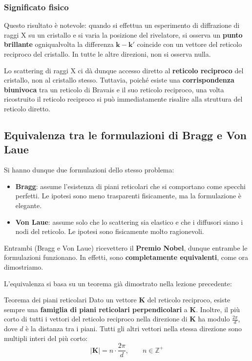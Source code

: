 \subsubsection{Significato fisico}

Questo risultato è notevole: quando si effettua un esperimento di diffrazione di raggi X su un cristallo e si varia la posizione del rivelatore, si osserva un \textbf{punto brillante} ogniqualvolta la differenza $\mathbf{k} - \mathbf{k}'$ coincide con un vettore del reticolo reciproco del cristallo. In tutte le altre direzioni, non si osserva nulla.

Lo scattering di raggi X ci dà dunque accesso diretto al \textbf{reticolo reciproco} del cristallo, non al cristallo stesso. Tuttavia, poiché esiste una \textbf{corrispondenza biunivoca} tra un reticolo di Bravais e il suo reticolo reciproco, una volta ricostruito il reticolo reciproco si può immediatamente risalire alla struttura del reticolo diretto.

\subsection{Equivalenza tra le formulazioni di Bragg e Von Laue}


Si hanno dunque due formulazioni dello stesso problema:

\begin{itemize}
    \item \textbf{Bragg}: assume l'esistenza di piani reticolari che si comportano come specchi perfetti. Le ipotesi sono meno trasparenti fisicamente, ma la formulazione è elegante.
    \item \textbf{Von Laue}: assume solo che lo scattering sia elastico e che i diffusori siano i nodi del reticolo. Le ipotesi sono fisicamente molto ragionevoli.
\end{itemize}

Entrambi (Bragg e Von Laue) ricevettero il \textbf{Premio Nobel}, dunque entrambe le formulazioni funzionano. In effetti, sono \textbf{completamente equivalenti}, come ora dimostriamo.


L'equivalenza si basa su un teorema già dimostrato nella lezione precedente:

\begin{definizione}{Teorema dei piani reticolari}
Dato un vettore $\mathbf{K}$ del reticolo reciproco, esiste sempre una \textbf{famiglia di piani reticolari perpendicolari} a $\mathbf{K}$. Inoltre, il più corto di tutti i vettori del reticolo reciproco nella direzione di $\mathbf{K}$ ha modulo $\frac{2\pi}{d}$, dove $d$ è la distanza tra i piani. Tutti gli altri vettori nella stessa direzione sono multipli interi del più corto:
$$|\mathbf{K}| = n \cdot \frac{2\pi}{d}, \qquad n \in \mathbb{Z}^+$$
\end{definizione}

